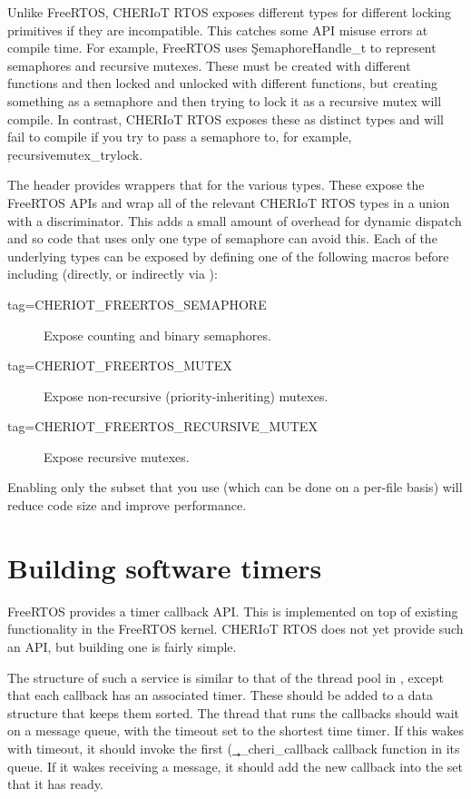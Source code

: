 Unlike FreeRTOS, CHERIoT RTOS exposes different types for different locking primitives if they are incompatible.
This catches some API misuse errors at compile time.
For example, FreeRTOS uses \c{SemaphoreHandle_t} to represent semaphores and recursive mutexes.
These must be created with different functions and then locked and unlocked with different functions, but creating something as a semaphore and then trying to lock it as a recursive mutex will compile.
In contrast, CHERIoT RTOS exposes these as distinct types and will fail to compile if you try to pass a semaphore to, for example, \c{recursivemutex_trylock}.

The  header provides wrappers that for the various types.
These expose the FreeRTOS APIs and wrap all of the relevant CHERIoT RTOS types in a union with a discriminator.
This adds a small amount of overhead for dynamic dispatch and so code that uses only one type of semaphore can avoid this.
Each of the underlying types can be exposed by defining one of the following macros before including  (directly, or indirectly via ):

\begin{description}
	\item[tag=CHERIOT_FREERTOS_SEMAPHORE]{ Expose counting and binary semaphores.}
	\item[tag=CHERIOT_FREERTOS_MUTEX]{ Expose non-recursive (priority-inheriting) mutexes.}
	\item[tag=CHERIOT_FREERTOS_RECURSIVE_MUTEX]{ Expose recursive mutexes.}
\end{description}

Enabling only the subset that you use (which can be done on a per-file basis) will reduce code size and improve performance.

\section{Building software timers}

FreeRTOS provides a timer callback API.
This is implemented on top of existing functionality in the FreeRTOS kernel.
CHERIoT RTOS does not yet provide such an API, but building one is fairly simple.

The structure of such a service is similar to that of the thread pool in , except that each callback has an associated timer.
These should be added to a data structure that keeps them sorted.
The thread that runs the callbacks should wait on a message queue, with the timeout set to the shortest time timer.
If this wakes with timeout, it should invoke the first (\c{__cheri_callback} callback function in its queue.
If it wakes receiving a message, it should add the new callback into the set that it has ready.

